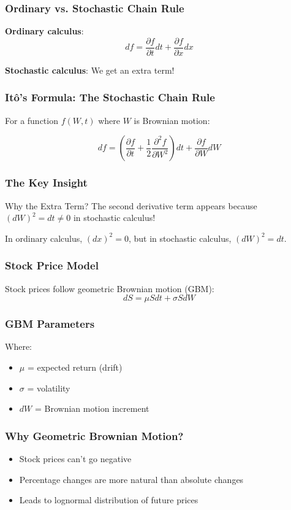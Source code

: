 \documentclass[aspectratio=169]{beamer}
\begin{document}
\begin{frame}
\frametitle{Ordinary vs. Stochastic Chain Rule}
\textbf{Ordinary calculus}: 
\[df = \frac{\partial f}{\partial t}dt + \frac{\partial f}{\partial x}dx\]

\textbf{Stochastic calculus}: We get an extra term!
\end{frame}

\begin{frame}
\frametitle{Itô's Formula: The Stochastic Chain Rule}
For a function \(f(W,t)\) where \(W\) is Brownian motion:

\[df = \left(\frac{\partial f}{\partial t} + \frac{1}{2} \frac{\partial^2 f}{\partial W^2}\right) dt + \frac{\partial f}{\partial W} dW\]
\end{frame}

\begin{frame}
\frametitle{The Key Insight}
\begin{block}{Why the Extra Term?}
The second derivative term appears because \((dW)^2 = dt \neq 0\) in stochastic calculus!
\end{block}

In ordinary calculus, \((dx)^2 = 0\), but in stochastic calculus, \((dW)^2 = dt\).
\end{frame}

\begin{frame}
\frametitle{Stock Price Model}
Stock prices follow geometric Brownian motion (GBM):
\[dS = \mu S dt + \sigma S dW\]
\end{frame}

\begin{frame}
\frametitle{GBM Parameters}
Where:
\begin{itemize}
\item \(\mu\) = expected return (drift)
\item \(\sigma\) = volatility
\item \(dW\) = Brownian motion increment
\end{itemize}
\end{frame}

\begin{frame}
\frametitle{Why Geometric Brownian Motion?}
\begin{itemize}
\item Stock prices can't go negative
\item Percentage changes are more natural than absolute changes
\item Leads to lognormal distribution of future prices
\end{itemize}
\end{frame}
\end{document}
